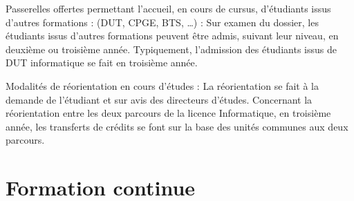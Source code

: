 \documentclass[10pt, a5paper]{report}
\begin{document}
\begin{spacing}{1.5}
Passerelles offertes permettant l’accueil, en cours de cursus, d’étudiants issus d’autres formations : (DUT, CPGE, BTS, …) :
Sur examen du dossier, les étudiants issus d'autres formations peuvent être admis, suivant leur niveau, en deuxième ou troisième année. Typiquement, l'admission des étudiants issus de DUT informatique se fait en troisième année.

Modalités de réorientation en cours d’études :
La réorientation se fait à la demande de l'étudiant et sur avis des directeurs d'études. Concernant la réorientation entre les deux parcours de la licence Informatique, en troisième année, les transferts de crédits se font sur la base des unités communes aux deux parcours.

\section*{Formation continue}

  \end{spacing}
\end{document}
